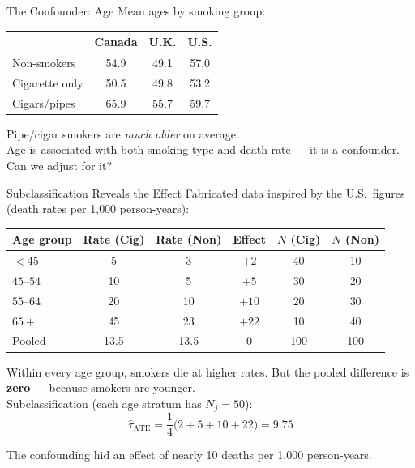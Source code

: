 \documentclass[xcolor=dvipsnames]{beamer}
\begin{document}
\begin{frame}{The Confounder: Age}
\small
Mean ages by smoking group:

\begin{center}
\begin{tabular}{@{} l c c c @{}}
\toprule
 & Canada & U.K. & U.S.\\
\midrule
Non-smokers     & 54.9 & 49.1 & 57.0 \\
Cigarette only  & 50.5 & 49.8 & 53.2 \\
Cigars/pipes    & 65.9 & 55.7 & 59.7 \\
\bottomrule
\end{tabular}
\end{center}

\bigskip
{} Pipe/cigar smokers are \textit{much older} on average.\\
\medskip
{} Age is associated with both smoking type and death rate --- it is a confounder.  Can we adjust for it?
\end{frame}


\begin{frame}{Subclassification Reveals the Effect}
\small
{} Fabricated data inspired by the U.S.\ figures (death rates per 1{,}000 person-years):

\begin{center}
\footnotesize
\begin{tabular}{@{} l c c c c c @{}}
\toprule
Age group & Rate (Cig) & Rate (Non) & Effect & $N$ (Cig) & $N$ (Non) \\
\midrule
$<45$    & 5  & 3  & $+2$  & 40 & 10 \\
$45$--$54$ & 10 & 5  & $+5$  & 30 & 20 \\
$55$--$64$ & 20 & 10 & $+10$ & 20 & 30 \\
$65+$    & 45 & 23 & $+22$ & 10 & 40 \\
\midrule
Pooled   & 13.5 & 13.5 & $0$ & 100 & 100 \\
\bottomrule
\end{tabular}
\end{center}

 Within every age group, smokers die at higher rates.  But the pooled difference is \textbf{zero} --- because smokers are younger.\\

\medskip
{} Subclassification (each age stratum has $N_j = 50$):
$$\hat\tau_{\text{ATE}} = \frac{1}{4}\big(2 + 5 + 10 + 22\big) = 9.75$$

 The confounding hid an effect of nearly 10 deaths per 1{,}000 person-years.
\end{frame}
\end{document}
